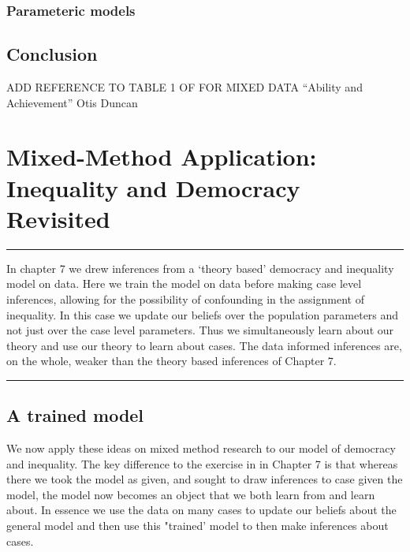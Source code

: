 \documentclass[
  12pt,
]{book}
\begin{document}
\hypertarget{parameteric-models}{%
\subsection{Parameteric models}\label{parameteric-models}}

\hypertarget{conclusion-1}{%
\section{Conclusion}\label{conclusion-1}}

ADD REFERENCE TO TABLE 1 OF FOR MIXED DATA ``Ability and Achievement'' Otis Duncan

\hypertarget{mixingapp}{%
\chapter{Mixed-Method Application: Inequality and Democracy Revisited}\label{mixingapp}}

\begin{center}\rule{0.5\linewidth}{0.5pt}\end{center}

In chapter 7 we drew inferences from a `theory based' democracy and inequality model on data. Here we train the model on data before making case level inferences, allowing for the possibility of confounding in the assignment of inequality. In this case we update our beliefs over the population parameters and not just over the case level parameters. Thus we simultaneously learn about our theory and use our theory to learn about cases. The data informed inferences are, on the whole, weaker than the theory based inferences of Chapter 7.

\begin{center}\rule{0.5\linewidth}{0.5pt}\end{center}

\hypertarget{a-trained-model}{%
\section{A trained model}\label{a-trained-model}}

We now apply these ideas on mixed method research to our model of democracy and inequality. The key difference to the exercise in in Chapter 7 is that whereas there we took the model as given, and sought to draw inferences to case given the model, the model now becomes an object that we both learn from and learn about. In essence we use the data on many cases to update our beliefs about the general model and then use this "trained' model to then make inferences about cases.
\end{document}
